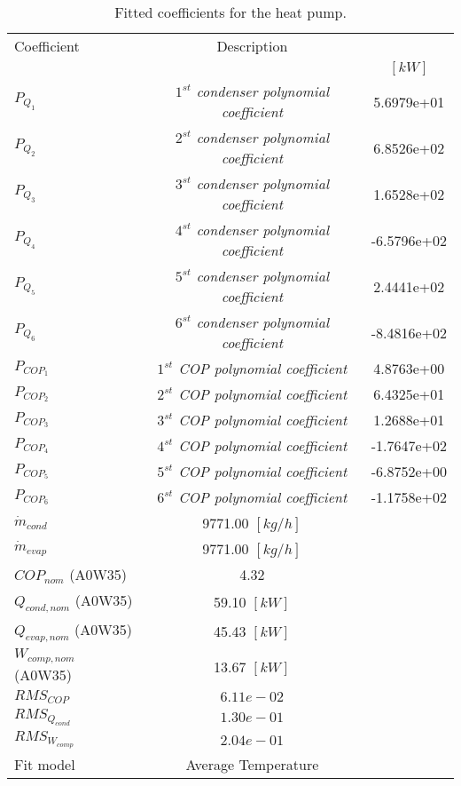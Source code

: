 \documentclass[english]{SPFShortReport}
\author{Dani Carbonell}
\begin{document}
\begin{table}[!ht]
\begin{small}
\caption{Fitted coefficients for the heat pump.}
\begin{center}
\resizebox{12cm}{!} 
{
\begin{tabular}{l | c c } 
\hline
\hline
Coefficient &Description & \\ 
 & &$[kW]$\\ 
\hline
$P_{Q_{1}}$ & \emph{$1^{st}$ condenser polynomial coefficient}  & 5.6979e+01    \\ 
$P_{Q_{2}}$ & \emph{$2^{st}$ condenser polynomial coefficient}  & 6.8526e+02    \\ 
$P_{Q_{3}}$ & \emph{$3^{st}$ condenser polynomial coefficient}  & 1.6528e+02    \\ 
$P_{Q_{4}}$ & \emph{$4^{st}$ condenser polynomial coefficient}  & -6.5796e+02    \\ 
$P_{Q_{5}}$ & \emph{$5^{st}$ condenser polynomial coefficient}  & 2.4441e+02    \\ 
$P_{Q_{6}}$ & \emph{$6^{st}$ condenser polynomial coefficient}  & -8.4816e+02    \\ 
\hline
$P_{COP_{1}}$ & \emph{$1^{st}$ COP polynomial coefficient}  & 4.8763e+00    \\ 
$P_{COP_{2}}$ & \emph{$2^{st}$ COP polynomial coefficient}  & 6.4325e+01    \\ 
$P_{COP_{3}}$ & \emph{$3^{st}$ COP polynomial coefficient}  & 1.2688e+01    \\ 
$P_{COP_{4}}$ & \emph{$4^{st}$ COP polynomial coefficient}  & -1.7647e+02    \\ 
$P_{COP_{5}}$ & \emph{$5^{st}$ COP polynomial coefficient}  & -6.8752e+00    \\ 
$P_{COP_{6}}$ & \emph{$6^{st}$ COP polynomial coefficient}  & -1.1758e+02    \\ 
\hline
$\dot m_{cond}$ & 9771.00 $[kg/h]$ \\ 
$\dot m_{evap}$ & 9771.00 $[kg/h]$ \\ 
\hline
$COP_{nom}$ (A0W35)& 4.32 \\ 
$Q_{cond,nom}$ (A0W35)& 59.10 $[kW]$\\ 
$Q_{evap,nom}$ (A0W35)& 45.43 $[kW]$\\ 
$W_{comp,nom}$ (A0W35)& 13.67 $[kW]$\\ 
\hline
 $RMS_{COP}$ & $6.11e-02$ \\ 
 $RMS_{Q_{cond}}$ & $1.30e-01$ \\ 
 $RMS_{W_{comp}}$ & $2.04e-01$ \\ 
\hline
Fit model & Average Temperature\\ 
\hline
\hline
\end{tabular}
}
\label{CoefTable}
\end{center}
\end{small}
\end{table}
\end{document}
